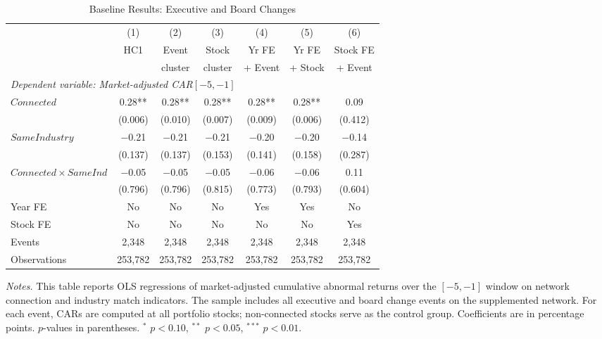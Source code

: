 \begin{table}[htbp]
\centering
\begin{threeparttable}
\caption{Baseline Results: Executive and Board Changes}
\label{tab:baseline}
\small
\begin{tabular}{lcccccc}
\toprule
 & (1) & (2) & (3) & (4) & (5) & (6) \\
 & HC1 & Event & Stock & Yr FE & Yr FE & Stock FE \\
 &  & cluster & cluster & + Event & + Stock & + Event \\
\midrule
\multicolumn{7}{l}{\textit{Dependent variable: Market-adjusted CAR$[-5,-1]$}} \\
\midrule
$Connected$ & 0.28** & 0.28** & 0.28** & 0.28** & 0.28** & 0.09 \\
 & (0.006) & (0.010) & (0.007) & (0.009) & (0.006) & (0.412) \\[0.3em]
$SameIndustry$ & $-$0.21 & $-$0.21 & $-$0.21 & $-$0.20 & $-$0.20 & $-$0.14 \\
 & (0.137) & (0.137) & (0.153) & (0.141) & (0.158) & (0.287) \\[0.3em]
$Connected \times SameInd$ & $-$0.05 & $-$0.05 & $-$0.05 & $-$0.06 & $-$0.06 & 0.11 \\
 & (0.796) & (0.796) & (0.815) & (0.773) & (0.793) & (0.604) \\[0.3em]
\midrule
Year FE & No & No & No & Yes & Yes & No \\
Stock FE & No & No & No & No & No & Yes \\
Events & 2,348 & 2,348 & 2,348 & 2,348 & 2,348 & 2,348 \\
Observations & 253,782 & 253,782 & 253,782 & 253,782 & 253,782 & 253,782 \\
\bottomrule
\end{tabular}
\begin{tablenotes}
\footnotesize
\item \textit{Notes.} This table reports OLS regressions of market-adjusted cumulative abnormal returns over the $[-5,-1]$ window on network connection and industry match indicators. The sample includes all executive and board change events on the supplemented network. For each event, CARs are computed at all portfolio stocks; non-connected stocks serve as the control group. Coefficients are in percentage points. $p$-values in parentheses. $^{*}$ $p<0.10$, $^{**}$ $p<0.05$, $^{***}$ $p<0.01$.
\end{tablenotes}
\end{threeparttable}
\end{table}